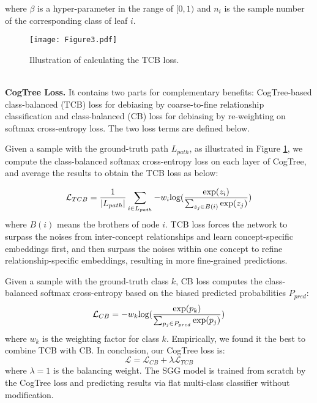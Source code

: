 \documentclass{article}
\begin{document}
where $\beta$ is a hyper-parameter  in the range of $[0,1)$ and $n_i$ is the sample number of the corresponding class of leaf $i$.
\begin{figure}[t]
    \centering
    \texttt{[image: Figure3.pdf]}
    \caption{Illustration of calculating the TCB loss.}
    \label{fig:treeloss}
\end{figure}
\\
\textbf{CogTree Loss.} It contains two  parts for complementary benefits: CogTree-based class-balanced (TCB) loss for debiasing by coarse-to-fine relationship classification and  class-balanced (CB) loss for debiasing by re-weighting on softmax cross-entropy loss. The two loss terms are defined below. 

Given a sample with the ground-truth path $L_{path}$, as illustrated in Figure \ref{fig:treeloss}, we compute the class-balanced softmax cross-entropy loss on each layer of CogTree, and average the results to obtain the TCB loss as below:
\iffalse
\begin{equation}
\mathcal{L}_{TCB}=\frac{1}{K}\sum_{k=1}^{K}-w_{S_k}\textup{log}(\frac{\textup{exp}(z_{S_{k}})}{\sum\nolimits_{z_j\in Z(S_{k-1})}\textup{exp}(z_{j})})
\label{eq:TCB}
\end{equation}
\fi
\begin{equation}
\mathcal{L}_{TCB}=\frac{1}{|L_{path}|}\sum_{i\in L_{path}}-w_{i}\textup{log}(\frac{\textup{exp}(z_{i})}{\sum\nolimits_{z_j\in B(i)}\textup{exp}(z_{j})})
\label{eq:TCB}
\end{equation}
where $B(i)$ means the brothers of node $i$. TCB loss  forces  the  network  to  surpass  the  noises from inter-concept relationships and learn concept-specific embeddings first, and then surpass  the  noises within one concept to refine relationship-specific embeddings,  resulting in more fine-grained predictions. 

Given a sample with the ground-truth class $k$, CB loss computes the class-balanced softmax cross-entropy based on the biased predicted probabilities $P_{pred}$: 
\begin{equation}
\mathcal{L}_{CB}=-w_{k}\textup{log}(\frac{\textup{exp}(p_{k})}{\sum\nolimits_{p_{j}\in P_{pred}}\textup{exp}(p_{j})})\label{eq:CB}
\end{equation}
where $w_k$ is the weighting factor \cite{Cui2019Class} for class $k$. Empirically, we found it the best to combine TCB with CB. In conclusion, our CogTree loss is: \begin{equation}
\mathcal{L} = \mathcal{L}_{CB} + \lambda\mathcal{L}_{TCB}
\label{eq:fullLoss}
\end{equation}
where $\lambda=1$ is the balancing weight. The SGG model is trained from scratch by the CogTree loss and predicting results via flat multi-class classifier without modification. 
\end{document}
